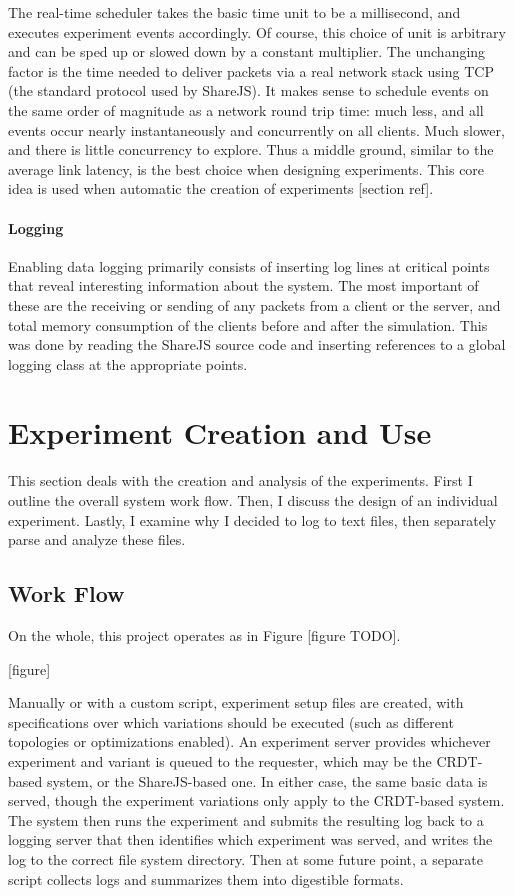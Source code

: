 \documentclass[12pt,a4paper,twoside,openright]{report}
\begin{document}
	The real-time scheduler takes the basic time unit to be a millisecond, and executes experiment events accordingly. Of course, this choice of unit is arbitrary and can be sped up or slowed down by a constant multiplier. The unchanging factor is the time needed to deliver packets via a real network stack using TCP (the standard protocol used by ShareJS). It makes sense to schedule events on the same order of magnitude as a network round trip time: much less, and all events occur nearly instantaneously and concurrently on all clients. Much slower, and there is little concurrency to explore. Thus a middle ground, similar to the average link latency, is the best choice when designing experiments. This core idea is used when automatic the creation of experiments [section ref].
	
	\paragraph{Logging}
	Enabling data logging primarily consists of inserting log lines at critical points that reveal interesting information about the system. The most important of these are the receiving or sending of any packets from a client or the server, and total memory consumption of the clients before and after the simulation. This was done by reading the ShareJS source code and inserting references to a global logging class at the appropriate points.
	
\section{Experiment Creation and Use}

	This section deals with the creation and analysis of the experiments. First I outline the overall system work flow. Then, I discuss the design of an individual experiment. Lastly, I examine why I decided to log to text files, then separately parse and analyze these files.

	\subsection{Work Flow}
	On the whole, this project operates as in Figure [figure TODO]. 
	
	[figure]
	
	
	Manually or with a custom script, experiment setup files are created, with specifications over which variations should be executed (such as different topologies or optimizations enabled). An experiment server provides whichever experiment and variant is queued to the requester, which may be the CRDT-based system, or the ShareJS-based one. In either case, the same basic data is served, though the experiment variations only apply to the CRDT-based system. The system then runs the experiment and submits the resulting log back to a logging server that then identifies which experiment was served, and writes the log to the correct file system directory. Then at some future point, a separate script collects logs and summarizes them into digestible formats.
\end{document}
